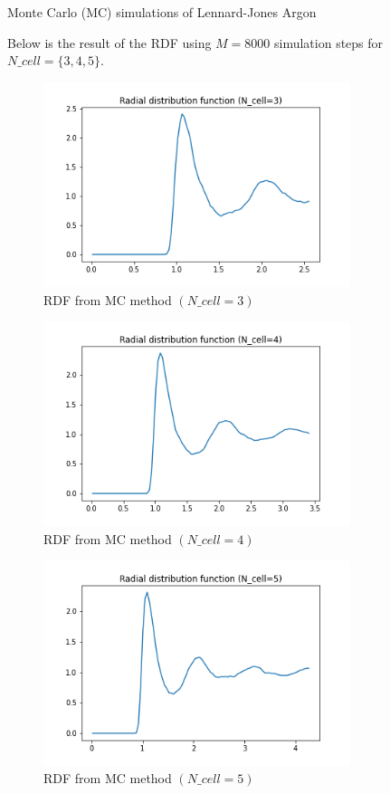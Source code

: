 \documentclass{article}
\begin{document}
\begin{section}{Monte Carlo (MC) simulations of Lennard-Jones Argon}
\begin{tcolorbox}[breakable]
			Below is the result of the RDF using $M = 8000$ simulation steps for $N\_cell = \{3, 4, 5\}$.

			\begin{figure}[H]
				\centering
				\includegraphics[width=0.8\textwidth]{./images/g_r(N_cell=3).png}
				\caption{RDF from MC method $(N\_cell=3)$}
				\label{fig:RDF_MC3}
			\end{figure}

			\begin{figure}[H]
				\centering
				\includegraphics[width=0.8\textwidth]{./images/g_r(N_cell=4).png}
				\caption{RDF from MC method $(N\_cell=4)$}
				\label{fig:RDF_MC4}
			\end{figure}

			\begin{figure}[H]
				\centering
				\includegraphics[width=0.8\textwidth]{./images/g_r(N_cell=5).png}
				\caption{RDF from MC method $(N\_cell=5)$}
				\label{fig:RDF_MC5}
			\end{figure}


\end{tcolorbox}
\end{section}
\end{document}
